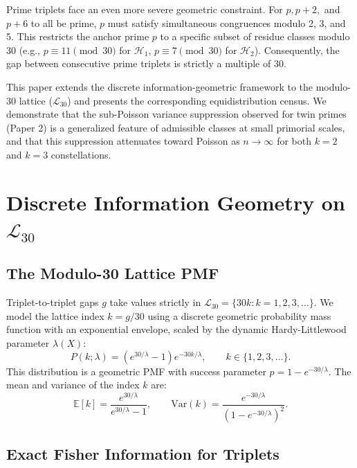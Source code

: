 \documentclass[11pt]{article}
\begin{document}
Prime triplets face an even more severe geometric constraint. For $p, p+2,$ and $p+6$ to all be prime, $p$ must satisfy simultaneous congruences modulo 2, 3, and 5. This restricts the anchor prime $p$ to a specific subset of residue classes modulo 30 (e.g., $p \equiv 11 \pmod{30}$ for $\mathcal{H}_1$, $p \equiv 7 \pmod{30}$ for $\mathcal{H}_2$). Consequently, the gap between consecutive prime triplets is strictly a multiple of 30.

This paper extends the discrete information-geometric framework to the modulo-30 lattice ($\mathcal{L}_{30}$) and presents the corresponding equidistribution census. We demonstrate that the sub-Poisson variance suppression observed for twin primes (Paper 2) is a generalized feature of admissible classes at small primorial scales, and that this suppression attenuates toward Poisson as $n \to \infty$ for both $k=2$ and $k=3$ constellations.

\section{Discrete Information Geometry on $\mathcal{L}_{30}$}

\subsection{The Modulo-30 Lattice PMF}

Triplet-to-triplet gaps $g$ take values strictly in $\mathcal{L}_{30} = \{30k : k = 1, 2, 3, \ldots\}$. We model the lattice index $k = g/30$ using a discrete geometric probability mass function with an exponential envelope, scaled by the dynamic Hardy-Littlewood parameter $\lambda(X)$:
\begin{equation}
    P(k; \lambda) = \left(e^{30/\lambda} - 1\right) e^{-30k/\lambda}, \qquad k \in \{1, 2, 3, \ldots\}.
\end{equation}
This distribution is a geometric PMF with success parameter $p = 1 - e^{-30/\lambda}$. The mean and variance of the index $k$ are:
\begin{equation}
    \mathbb{E}[k] = \frac{e^{30/\lambda}}{e^{30/\lambda} - 1}, \qquad \text{Var}(k) = \frac{e^{-30/\lambda}}{(1 - e^{-30/\lambda})^2}.
\end{equation}

\subsection{Exact Fisher Information for Triplets}
\end{document}
